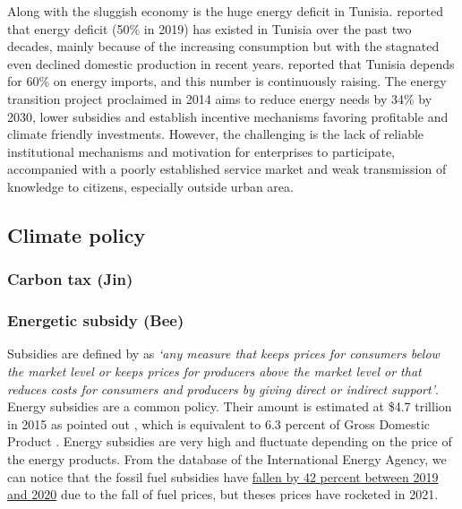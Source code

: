 \documentclass[
]{article}
\begin{document}
Along with the sluggish economy is the huge energy deficit in Tunisia.
\textcite{irena2021} reported that energy deficit (50\% in 2019) has
existed in Tunisia over the past two decades, mainly because of the
increasing consumption but with the stagnated even declined domestic
production in recent years. \textcite{giz} reported that Tunisia depends
for 60\% on energy imports, and this number is continuously raising. The
energy transition project proclaimed in 2014 aims to reduce energy needs
by 34\% by 2030, lower subsidies and establish incentive mechanisms
favoring profitable and climate friendly investments. However, the
challenging is the lack of reliable institutional mechanisms and
motivation for enterprises to participate, accompanied with a poorly
established service market and weak transmission of knowledge to
citizens, especially outside urban area.

\hypertarget{climate-policy}{%
\subsection{Climate policy}\label{climate-policy}}

\hypertarget{carbon-tax-jin}{%
\subsubsection{Carbon tax (Jin)}\label{carbon-tax-jin}}

\hypertarget{energetic-subsidy-bee}{%
\subsubsection{Energetic subsidy (Bee)}\label{energetic-subsidy-bee}}

Subsidies are defined by \textcite{demoor1997} as \emph{`any measure
that keeps prices for consumers below the market level or keeps prices
for producers above the market level or that reduces costs for consumers
and producers by giving direct or indirect support'}. Energy subsidies
are a common policy. Their amount is estimated at \$4.7 trillion in 2015
as pointed out \textcite{coady2019}, which is equivalent to 6.3 percent
of Gross Domestic Product . Energy subsidies are very high and fluctuate
depending on the price of the energy products. From the database of the
International Energy Agency, we can notice that the fossil fuel
subsidies have \href{https://www.iea.org/topics/energy-subsidies}{fallen
by 42 percent between 2019 and 2020} due to the fall of fuel prices, but
theses prices have rocketed in 2021.
\end{document}
